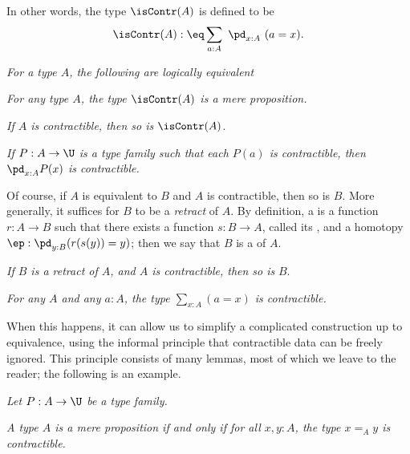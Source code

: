 \documentclass[12pt]{article}
\begin{document}
In other words, the type $\isContr(A)$ is defined to be
$$
\isContr(A):\eq\sum_{a:A}\ \pd_{x:A}\ (a=x).
$$

\nn{} \emph{For a type $A$, the following are logically equivalent}

\nn{} \emph{For any type $A$, the type $\isContr(A)$ is a mere proposition.}

\nn{} \emph{If $A$ is contractible, then so is} $\isContr(A)$.

\nn{} \emph{If $P:A\to\U$ is a type family such that each $P(a)$ is contractible, then $\pd_{x:A}P(x)$ is contractible.}

Of course, if $A$ is equivalent to $B$ and $A$ is contractible, then so is $B$. More generally, it suffices for $B$ to be a \emph{retract} of $A$. By definition, a  is a function $r:A\to B$ such that there exists a function $s:B\to A$, called its , and a homotopy $\ep:\pd_{y:B}(r(s(y))=y)$; then we say that $B$ is a  of $A$.

\nn{} \emph{If $B$ is a retract of $A$, and $A$ is contractible, then so is} $B$.

\nn{} \emph{For any $A$ and any $a:A$, the type $\sum_{x:A}(a=x)$ is contractible.}

When this happens, it can allow us to simplify a complicated construction up to equivalence, using the informal principle that contractible data can be freely ignored. This principle consists of many lemmas, most of which we leave to the reader; the following is an example.

\nn{} \emph{Let $P:A\to\U$ be a type family.}

\nn{} \emph{A type $A$ is a mere proposition if and only if for all $x,y:A$, the type $x=_Ay$ is contractible.}
\end{document}
